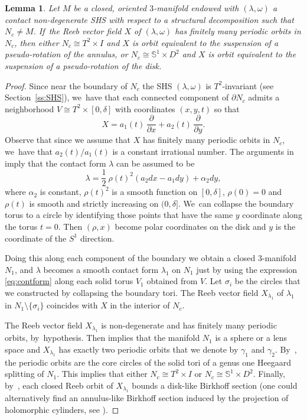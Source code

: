 \documentclass[11pt]{article}
\newcommand{\threemanifold}{$3$\nobreakdash-mani\-fold\xspace}
\newtheorem{lemma}[theorem]{Lemma}
\theoremstyle{definition}
\newcommand{\pp}[2]{\frac{\partial#1}{\partial#2}}
\newcommand{\mS}{\mathbb{S}}
\begin{document}
\begin{lemma}\label{lem:reebpseudo}
Let $M$ be a closed, oriented \threemanifold endowed with $(\lambda,\omega)$ a contact non-degenerate SHS with respect to a structural decomposition such that $N_c\neq M$. If~the Reeb vector field $X$ of $(\lambda, \omega)$ has finitely many periodic orbits in $N_c$, then either $N_c\cong T^2\times I$ and $X$ is orbit equivalent to the suspension of a pseudo-rotation of the annulus, or $N_c\cong \mS^1\times D^2$ and $X$ is orbit equivalent to the suspension of a pseudo-rotation of the disk.
\end{lemma}

\begin{proof}
Since near the boundary of $N_c$ the SHS $(\lambda, \omega)$ is $T^2$-invariant (see Section~\ref{ss:SHS}), we~have that each connected component of $\partial N_c$ admits a neighborhood $V\cong T^2\times [0,\delta]$ with coordinates $(x,y,t)$ so that
\begin{equation}\label{eq:reebinv}
X=a_1(t)\,\pp{}{x} + a_2(t)\, \pp{}{y}.
\end{equation}
{Observe that since we assume that $X$ has finitely many periodic orbits in $N_c$, we~have that $a_2(t)/a_1(t)$ is a constant irrational number. The arguments in \cite[\S 5.2]{HT} imply that the contact form $\lambda$} can be assumed to be
\begin{equation}\label{eq:contform}
\lambda= \frac{1}{2}\ \rho(t)^2 (a_2dx-a_1dy) + \alpha_2 dy,
\end{equation}
where $\alpha_2$ is constant, $\rho(t)^2$ is a smooth function on $[0,\delta]$, $\rho(0)=0$ and $\rho(t)$ is smooth and strictly increasing on $(0,\delta]$. We~can collapse the boundary torus to a circle by identifying those points that have the same $y$ coordinate along the torus $t=0$. Then $(\rho,x)$ become polar coordinates on the disk and $y$ is the coordinate of the $S^1$ direction.

Doing this along each component of the boundary we obtain a closed \threemanifold~$N_1$, and $\lambda$ becomes a smooth contact form $\lambda_1$ on $N_1$ just by using the expression \eqref{eq:contform} along each solid torus $V_1$ obtained from $V$. Let $\sigma_i$ be the circles that we constructed by collapsing the boundary tori. The Reeb vector field $X_{\lambda_1}$ of $\lambda_1$ in $N_1\setminus \{\sigma_i\}$ coincides with $X$ in the interior of $N_c$.

The Reeb vector field $X_{\lambda_1}$ is non-degenerate and has finitely many periodic orbits, by~hypothesis. Then \cite[Th.\,1.2]{CDR} implies that the manifold $N_1$ is a sphere or a lens space and $X_{\lambda_1}$ has exactly two periodic orbits that we denote by $\gamma_1$ and $\gamma_2$. By~\cite[Th.\,1.2]{HT}, the periodic orbits are the core circles of the solid tori of a genus one Heegaard splitting of $N_1$. This implies that either $N_c\cong T^2\times I$ or $N_c \cong \mS^1 \times D^2$. Finally, by~\cite[Cor.\,1.10]{CGHHL}, each closed Reeb orbit of $X_{\lambda_1}$ bounds a disk-like Birkhoff section (one could alternatively find an annulus-like Birkhoff section induced by the projection of holomorphic cylinders, see \cite[\S 4.6]{HT}).


\end{proof}
\end{document}
